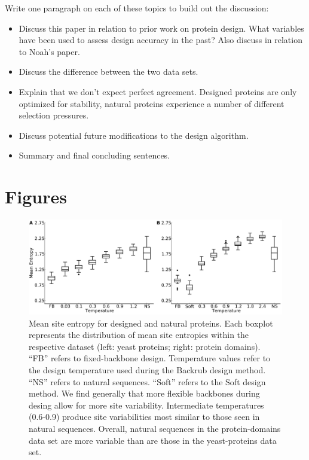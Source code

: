 \documentclass[12pt]{article}
\begin{document}
{
\color{red}Write one paragraph on each of these topics to build out the discussion:
\begin{itemize}
\item Discuss this paper in relation to prior work on protein design. What variables have been used to assess design accuracy in the past? Also discuss in relation to Noah's paper.
\item Discuss the difference between the two data sets.
\item Explain that we don't expect perfect agreement. Designed proteins are only optimized for stability, natural proteins experience a number of different selection pressures.
\item Discuss potential future modifications to the design algorithm.
\item Summary and final concluding sentences.
\end{itemize}
}



\cleardoublepage

\section{Figures}

\begin{figure}[H]
\centerline{\includegraphics[width = 6in]{figures/Mean_Entropy_vs_Temp_Combo_Boxplot.pdf}} %
\caption{Mean site entropy for designed and natural proteins. Each boxplot represents the distribution of mean site entropies within the respective dataset (left: yeast proteins; right: protein domains). ``FB'' refers to fixed-backbone design. Temperature values refer to the design temperature used during the Backrub design method. ``NS'' refers to natural sequences. ``Soft'' refers to the Soft design method. We find generally that more flexible backbones during desing allow for more site variability. Intermediate temperatures (0.6-0.9) produce site variabilities most similar to those seen in natural sequences. Overall, natural sequences in the protein-domains data set are more variable than are those in the yeast-proteins data set.}
\label{MeanEntropyComparison}
\end{figure}
\end{document}
